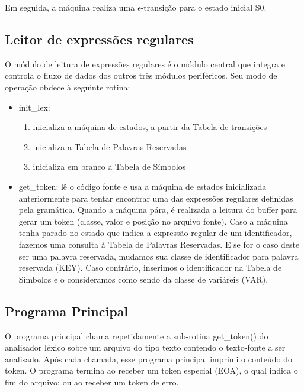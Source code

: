 \documentclass[
	article,			%
	11pt,				%
	oneside,			%
	a4paper,			%
	english,			%
	brazil,				%
	]{abntex2}
\begin{document}
Em seguida, a máquina realiza uma $\epsilon$-transição para o estado inicial S0.

\subsection{Leitor de expressões regulares}

O módulo de leitura de expressões regulares é o módulo central que integra e controla o fluxo de dados dos outros três módulos periféricos. Seu modo de operação obdece à seguinte rotina:

\begin{itemize}
	\item init\_lex:

	\begin{enumerate}
		\item inicializa a máquina de estados, a partir da Tabela de transições
		\item inicializa a Tabela de Palavras Reservadas
		\item inicializa em branco a Tabela de Símbolos
	\end{enumerate}

	\item get\_token: lê o código fonte e usa a máquina de estados inicializada anteriormente para tentar encontrar uma das expressões regulares definidas pela gramática. Quando a máquina pára, é realizada a leitura do buffer para gerar um token (classe, valor e posição no arquivo fonte). Caso a máquina tenha parado no estado que indica a expressão regular de um identificador, fazemos uma consulta à Tabela de Palavras Reservadas. E se for o caso deste ser uma palavra reservada, mudamos sua classe de identificador para palavra reservada (KEY). Caso contrário, inserimos o identificador na Tabela de Símbolos e o consideramos como sendo da classe de variáreis (VAR).
\end{itemize}

\subsection{Programa Principal}

O programa principal chama repetidamente a sub-rotina get\_token() do analisador léxico sobre um arquivo do tipo texto contendo o texto-fonte a ser analisado. Após cada chamada, esse programa principal imprimi o conteúdo do token. O programa termina ao receber um token especial (EOA), o qual indica o fim do arquivo; ou ao receber um token de erro. 
\end{document}
